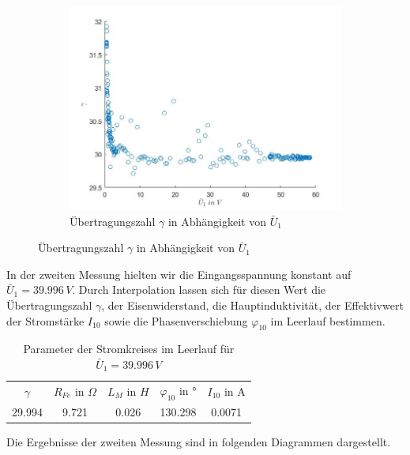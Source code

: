 \documentclass[a4paper, 12pt,]{scrartcl}
\begin{document}
\begin{figure}[H]
\begin{adjustwidth}{-1em}{7em}
  \begin{subfigure}[b]{0.5\textwidth}
    \includegraphics[width=\textwidth]{U11gam}
    \caption{Übertragungszahl $\gamma$ in Abhängigkeit von $\bar{U}_1$}
    \label{fig:}
  \end{subfigure} 
\end{adjustwidth}
\end{figure}
In der zweiten Messung hielten wir die Eingangsspannung konstant auf $\bar{U}_1=39.996\,V$. Durch Interpolation lassen sich für diesen Wert die Übertragungszahl $\gamma$, der Eisenwiderstand, die Hauptinduktivität, der Effektivwert der Stromstärke $I_{10}$ sowie die Phasenverschiebung $\varphi_{10}$ im Leerlauf bestimmen.
\begin{table}[H]\centering\begin{tabular}{ccccc}$\gamma$&$R_{Fe}$ in $\Omega$&$L_M$ in $H$&$\varphi_{10}$ in °&$I_{10}$ in A\\
29.994&9.721&0.026&130.298&0.0071\end{tabular}
\caption{Parameter der Stromkreises im Leerlauf für $\bar{U}_1=39.996\,V$}\end{table}
Die Ergebnisse der zweiten Messung sind in folgenden Diagrammen dargestellt.
\end{document}

